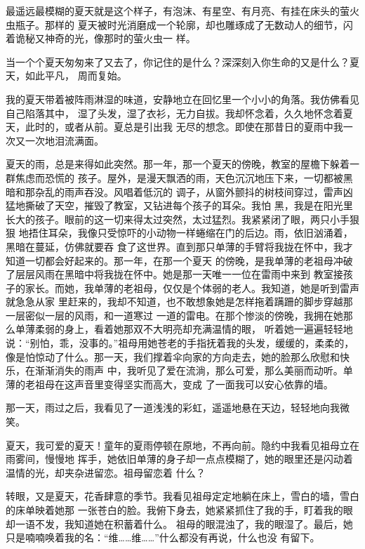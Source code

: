 		最遥远最模糊的夏天就是这个样子，有泡沫、有星空、有月亮、有挂在床头的萤火虫瓶子。那样的
	夏天被时光消磨成一个轮廓，却也雕琢成了无数动人的细节，闪着诡秘又神奇的光，像那时的萤火虫一
	样。

	\endwriting



		当一个个夏天匆匆来了又去了，你记住的是什么？深深刻入你生命的又是什么？夏天，如此平凡，
	周而复始。

		我的夏天带着被阵雨淋湿的味道，安静地立在回忆里一个小小的角落。我仿佛看见自己陷落其中，
	湿了头发，湿了衣衫，无力自拔。我却怀念着，久久地怀念着夏天，此时的，或者从前。夏总是引出我
	无尽的想念。即使在那昔日的夏雨中我一次又一次地泪流满面。

		夏天的雨，总是来得如此突然。那一年，那一个夏天的傍晚，教室的屋檐下躲着一群焦虑而恐慌的
	孩子。屋外，是漫天飘洒的雨，天色沉沉地压下来，一切都被黑暗和那杂乱的雨声吞没。风唱着低沉的
	调子，从窗外颤抖的树枝间穿过，雷声凶猛地撕破了天空，摧毁了教室，又钻进每个孩子的耳朵。我怕
	黑，我是在阳光里长大的孩子。眼前的这一切来得太过突然，太过猛烈。我紧紧闭了眼，两只小手狠狠
	地捂住耳朵，我像只受惊吓的小动物一样蜷缩在门的后边。雨，依旧汹涌着，黑暗在蔓延，仿佛就要吞
	食了这世界。直到那只单薄的手臂将我拢在怀中，我才知道一切都会好起来的。那一年，在那一个夏天
	的傍晚，是我单薄的老祖母冲破了层层风雨在黑暗中将我拢在怀中。她是那一天唯一一位在雷雨中来到
	教室接孩子的家长。而她，我单薄的老祖母，仅仅是个体弱的老人。我知道，她是听到雷声就急急从家
	里赶来的，我却不知道，也不敢想象她是怎样拖着蹒跚的脚步穿越那一层密似一层的风雨，和一道寒过
	一道的雷电。在那个惨淡的傍晚，我拥在她那么单薄柔弱的身上，看着她那双不大明亮却充满温情的眼，
	听着她一遍遍轻轻地说：“别怕，乖，没事的。”祖母用她苍老的手指抚着我的头发，缓缓的，柔柔的，
	像是怕惊动了什么。那一天，我们撑着伞向家的方向走去，她的脸那么欣慰和快乐，在渐渐消失的雨声
	中，我听见了爱在流淌，那么可爱，那么美丽而动听。单薄的老祖母在这声音里变得坚实而高大，变成
	了一面我可以安心依靠的墙。

		那一天，雨过之后，我看见了一道浅浅的彩虹，遥遥地悬在天边，轻轻地向我微笑。

		夏天，我可爱的夏天！童年的夏雨停顿在原地，不再向前。隐约中我看见祖母立在雨雾间，慢慢地
	挥手，她依旧单薄的身子却一点点模糊了，她的眼里还是闪动着温情的光，却夹杂进留恋。祖母留恋着
	什么？

		转眼，又是夏天，花香肆意的季节。我看见祖母定定地躺在床上，雪白的墙，雪白的床单映着她那
	一张苍白的脸。我俯下身去，她紧紧抓住了我的手，盯着我的眼却一语不发，我知道她在积蓄着什么。
	祖母的眼混浊了，我的眼湿了。最后，她只是喃喃唤着我的名：“维……维……”什么都没有再说，什么也没
	有留下。

